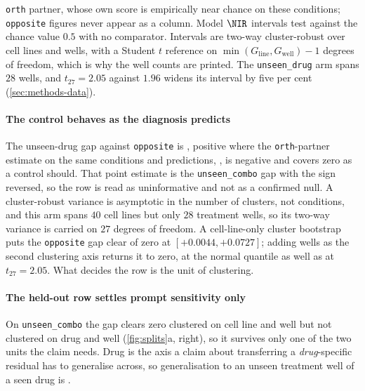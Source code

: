 \begin{table}[htbp]
\begin{fullwidth}
\begin{threeparttable}
\begin{tablenotes}[flushleft]
\texttt{orth} partner, whose own score is empirically near chance on these
conditions; \texttt{opposite} figures never appear as a column. Model $\NIR$
intervals test against the chance value $0.5$ with no comparator. Intervals are
two-way cluster-robust over cell lines and wells, with a Student $t$ reference
on $\min(G_{\textrm{line}}, G_{\textrm{well}}) - 1$ degrees of freedom, which is
why the well counts are printed. The \texttt{unseen\_drug} arm spans $28$
wells, and $t_{27} = 2.05$ against $1.96$ widens its interval by five per cent
(\cref{sec:methods-data}).
\end{tablenotes}
\end{threeparttable}
\end{fullwidth}
\end{table}

\paragraph{The control behaves as the diagnosis predicts} The unseen-drug gap
against \texttt{opposite} is , positive where the
\texttt{orth}-partner estimate on the same conditions and predictions,
, is negative and covers zero as a control should.
That point estimate is the \texttt{unseen\_combo} gap with the sign reversed, so
the row is read as uninformative and not as a confirmed null. A cluster-robust
variance is asymptotic in the number of clusters, not conditions, and this arm
spans $40$ cell lines but only $28$ treatment wells, so its two-way variance is
carried on $27$ degrees of freedom. A cell-line-only cluster bootstrap puts the
\texttt{opposite} gap clear of zero at $[+0.0044, +0.0727]$; adding wells as the
second clustering axis returns it to zero, at the normal quantile as well as at
$t_{27} = 2.05$. What decides the row is the unit of clustering.

\paragraph{The held-out row settles prompt sensitivity only} On
\texttt{unseen\_combo} the gap clears zero clustered on cell line and well but
not clustered on drug and
well (\cref{fig:splits}a, right), so it survives only one of the two units the
claim needs. Drug is the axis
a claim about transferring a \emph{drug}-specific residual has to generalise
across, so
generalisation to an unseen treatment well of a seen drug is \notestablished.


